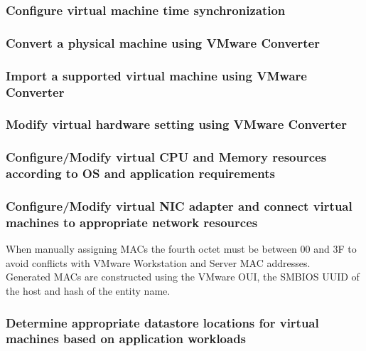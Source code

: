 \subsubsection{Configure virtual machine time synchronization}

\subsubsection{Convert a physical machine using VMware Converter}

\subsubsection{Import a supported virtual machine using VMware Converter}

\subsubsection{Modify virtual hardware setting using VMware Converter}

\subsubsection{Configure/Modify virtual CPU and Memory resources according to OS and application requirements}

\subsubsection{Configure/Modify virtual NIC adapter and connect virtual machines to appropriate network resources}

When manually assigning MACs the fourth octet must be between 00 and 3F to
avoid conflicts with VMware Workstation and Server MAC addresses.\\

Generated MACs are constructed using the VMware OUI, the SMBIOS UUID of the
host and hash of the entity name.

\subsubsection{Determine appropriate datastore locations for virtual machines based on application workloads}
